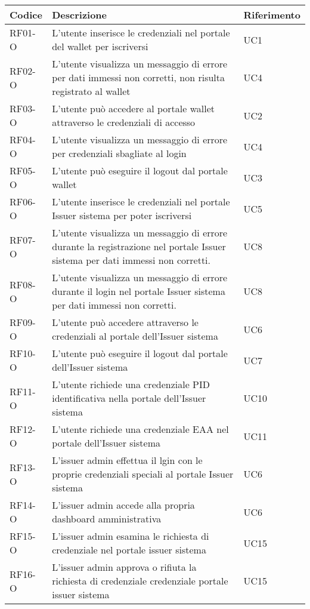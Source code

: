     \begin{longtable}{|p{}|p{}|p{}|}
        \hline
        \textbf{Codice} & \textbf{Descrizione} & \textbf{Riferimento} \\
        \hline
        RF01-O & L'utente inserisce le credenziali nel portale del wallet per iscriversi & UC1\\
        RF02-O & L'utente visualizza un messaggio di errore per dati immessi non corretti, non risulta registrato al wallet & UC4\\
        RF03-O & L'utente può accedere al portale wallet attraverso le credenziali di accesso & UC2\\
        RF04-O & L'utente visualizza un messaggio di errore per credenziali sbagliate al login & UC4\\ 
        RF05-O & L'utente può eseguire il logout dal portale wallet & UC3\\
        RF06-O & L'utente inserisce le credenziali nel portale Issuer sistema per poter iscriversi & UC5\\
        RF07-O & L'utente visualizza un messaggio di errore durante la registrazione nel portale Issuer sistema per dati immessi non corretti. & UC8\\
        RF08-O & L'utente visualizza un messaggio di errore durante il login nel portale Issuer sistema per dati immessi non corretti. & UC8\\
        RF09-O & L'utente può accedere attraverso le credenziali al portale dell'Issuer sistema & UC6\\
        RF10-O & L'utente può eseguire il logout dal portale dell'Issuer sistema & UC7\\
        RF11-O & L'utente richiede una credenziale PID identificativa nella portale dell'Issuer sistema & UC10\\
        RF12-O & L'utente richiede una credenziale EAA nel portale dell'Issuer sistema & UC11\\
        RF13-O & L'issuer admin effettua il lgin con le proprie credenziali speciali al portale Issuer sistema & UC6\\ 
        RF14-O & L'issuer admin accede alla propria dashboard amministrativa & UC6\\
        RF15-O & L'issuer admin esamina le richiesta di credenziale nel portale issuer sistema  & UC15\\
        RF16-O & L'issuer admin approva o rifiuta la richiesta di credenziale credenziale portale issuer sistema & UC15\\

\end{longtable}
